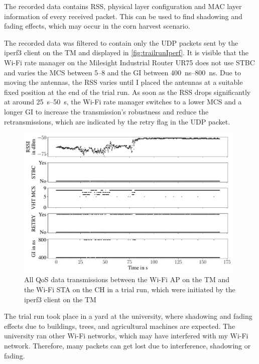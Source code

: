 The recorded data contains \ac{RSS}, physical layer configuration and \ac{MAC} layer information of every received packet.
This can be used to find shadowing and fading effects, which may occur in the corn harvest scenario.



The recorded data was filtered to contain only the \ac{UDP} packets sent by the iperf3 client on the \ac{TM}
and displayed in \autoref{fig:trailrunIperf}.
It is visible that the Wi-Fi rate manager on the Milesight Industrial Router UR75 does not use \ac{STBC} and varies
the \ac{MCS} between \numrange{5}{8} and the \ac{GI} between \SIrange{400}{800}{\nano\second}.
Due to moving the antennas, the \ac{RSS} varies until I placed the antennas at a suitable fixed position at the end of the trial run.
As soon as the \ac{RSS} drops significantly at around \SIrange{25}{50}{\second}, the Wi-Fi rate manager switches to a lower \ac{MCS} and a longer
\ac{GI} to increase the transmission's robustness and reduce the retransmissions, which are indicated by the retry flag in the \ac{UDP} packet.

\begin{figure}[]%
   \centering
   \includegraphics[width=0.98\textwidth]{figures/wireless5_144}
   \caption{All QoS data transmissions between the Wi-Fi \acf{AP} on the \acf{TM} and the Wi-Fi \ac{STA} on the \acf{CH} in a trial run,
   which were initiated by the iperf3 client on the \acf{TM}}
   \label{fig:trailrunIperf}%
\end{figure}

The trial run took place in a yard at the university, where shadowing and fading effects due to buildings, trees, and agricultural machines are
expected.
The university ran other Wi-Fi networks, which may have interfered with my Wi-Fi network.
Therefore, many packets can get lost due to interference, shadowing or fading.

